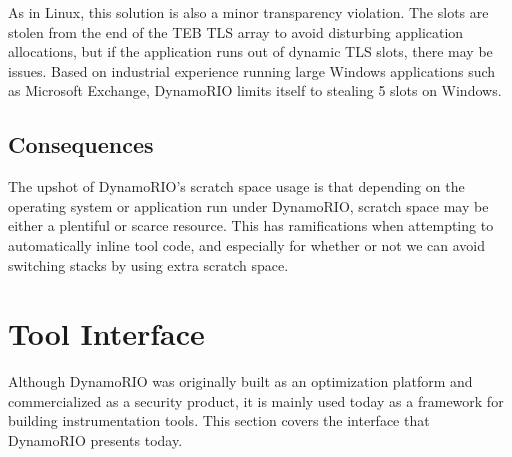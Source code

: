 As in Linux, this solution is also a minor transparency violation.  The slots
are stolen from the end of the TEB TLS array to avoid disturbing application
allocations, but if the application runs out of dynamic TLS slots, there may be
issues.  Based on industrial experience running large Windows applications such
as Microsoft Exchange, DynamoRIO limits itself to stealing 5 slots on Windows.

\subsection{Consequences}

The upshot of DynamoRIO's scratch space usage is that depending on the operating
system or application run under DynamoRIO, scratch space may be either a
plentiful or scarce resource.  This has ramifications when attempting to
automatically inline tool code, and especially for whether or not we can avoid
switching stacks by using extra scratch space.

\section{Tool Interface}

Although DynamoRIO was originally built as an optimization platform and
commercialized as a security product, it is mainly used today as a framework for
building instrumentation tools.  This section covers the interface that
DynamoRIO presents today.

